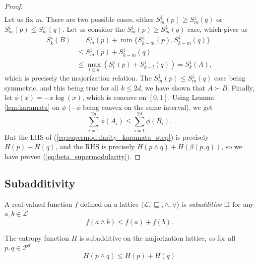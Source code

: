 \begin{proof}
\begin{gather}
    \end{gather} 
    Let us fix $m$. There are two possible cases, either $S^\downarrow_m (p) \geq S^\downarrow_m (q)$ or $S^\downarrow_m (p) \leq S^\downarrow_m (q)$. Let us consider the $S^\downarrow_m (p) \geq S^\downarrow_m (q)$ case, which gives us
    \begin{align}
        S^\downarrow_k (B) &= S^\downarrow_m (p) + \min \{S^\downarrow_{k-m} (p), S^\downarrow_{k-m} (q)\} \\
        &\leq S^\downarrow_m (p) + S^\downarrow_{k-m} (q) \\
        &\leq \max_{l\leq k} (S^\downarrow_l (p) +S^\downarrow_{k-l} (q)) = S^\downarrow_k (A),
    \end{align}
    which is precisely the majorization relation. The $S^\downarrow_m (p) \leq S^\downarrow_m (q)$ case being symmetric, and this being true for all $k \leq 2d$, we have shown that $A \succ B$.
    Finally, let $\phi(x) = -x \log(x)$, which is concave on $[0, 1]$. Using Lemma \ref{lem:karamata} on $\phi$ ($-\phi$ being convex on the same interval), we get
    \begin{equation} \label{eq:supermodularity_karamata_step}
        \sum_{i=1}^{2d} \phi(A_i) \leq \sum_{i=1}^{2d} \phi(B_i).
    \end{equation}
    But the LHS of (\ref{eq:supermodularity_karamata_step}) is precisely $H(p) + H(q)$, and the RHS is precisely $H(p \wedge q) + H(\beta(p, q))$, so we have proven (\ref{eq:beta_supermodularity}). \qedhere
\end{proof}



\subsection{Subadditivity} \label{sec:subadditivity}

\begin{definition}[Subadditivity]
    A real-valued function $f$ defined on a lattice $\langle \mathcal{L}, \sqsubseteq, \wedge, \vee \rangle$ is \textit{subadditive} iff for any $a, b \in \mathcal{L}$
    \begin{equation}
        f(a \wedge b) \leq f(a) + f(b).
    \end{equation}
\end{definition}

\begin{theorem}
    The entropy function $H$ is subadditive on the majorization lattice, so for all $p, q \in \mathcal{P}^d$
    \begin{equation}
        H(p \wedge q) \leq H(p) + H(q)
    \end{equation}
\end{theorem}



